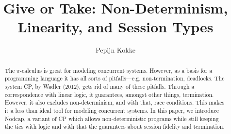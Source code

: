\documentclass[a4paper,UKenglish]{lipics-v2016}
\title{Give or Take: Non-Determinism, Linearity, and Session Types}
\author[1]{Pepijn Kokke}
\affil[1]{LFCS, University of Edinburgh, Edinburgh, United Kingdom\\
  \texttt{pepijn.kokke@ed.ac.uk}}
\begin{document}
\maketitle

\begin{abstract} %
The $\pi$-calculus is great for modeling concurrent systems. However, as a basis
for a programming language it has all sorts of pitfalls---e.g. non-termination,
deadlocks. The system CP, by Wadler (2012), gets rid of many of these pitfalls.
Through a correspondence with linear logic, it guarantees, amongst other things,
termination. However, it also excludes non-determinism, and with that, race
conditions. This makes it a less than ideal tool for modeling concurrent
systems. In this paper, we introduce Nodcap, a variant of CP which allows
non-deterministic programs while still keeping the ties with logic and with that
the guarantees about session fidelity and termination. 
\end{abstract}


\end{document}
